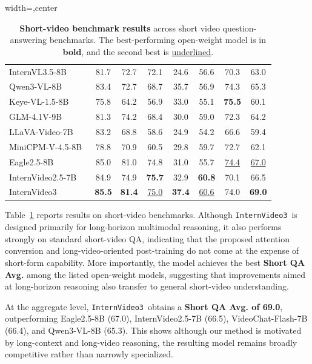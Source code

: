 \documentclass[11pt, letterpaper]{template}
\theoremstyle{plain}
\theoremstyle{definition}
\theoremstyle{remark}
\newcommand{\name}{\texttt{InternVideo3}\xspace}
\begin{document}
\begin{table}[t]
\begin{adjustbox}{width=\linewidth,center}
\begin{tabular}{lccccccc}
InternVL3.5-8B~\citep{internvl35} & 81.7 & 72.7 & 72.1 & 24.6 & 56.6 & 70.3 & 63.0\\
Qwen3-VL-8B~\citep{qwen3vl} & 83.4 & 72.7 & 68.7 & 35.7 & 56.9 & 74.3 & 65.3\\
Keye-VL-1.5-8B~\citep{keyevl15} & 75.8 & 64.2 & 56.9 & 33.0 & 55.1 & \textbf{75.5} & 60.1\\
GLM-4.1V-9B~\citep{hong2025glm} & 81.3 & 74.2 & 68.4 & 30.0 & 59.0 & 72.3 & 64.2\\
LLaVA-Video-7B~\citep{zhang2024llava} & 83.2 & 68.8 & 58.6 & 24.9 & 54.2 & 66.6 & 59.4\\
MiniCPM-V-4.5-8B~\citep{yu2025minicpm} & 78.8 & 70.9 & 60.5 & 29.8 & 59.7 & 72.7 & 62.1\\
Eagle2.5-8B~\citep{chen2026eagle} & 85.0 & 81.0 & 74.8 & 31.0 & 55.7 & \underline{74.4} & \underline{67.0}\\
InternVideo2.5-7B~\citep{wang2025internvideo2} & 84.9 & 74.9 & \textbf{75.7} & 32.9 & \textbf{60.8} & 70.1 & 66.5\\
InternVideo3 & \textbf{85.5} & \textbf{81.4} & \underline{75.0} & \textbf{37.4} & \underline{60.6} & 74.0 & \textbf{69.0} \\
\bottomrule
\end{tabular}
\end{adjustbox}
\caption{\textbf{Short-video benchmark results} across short video question-answering benchmarks. The best-performing open-weight model is in \textbf{bold}, and the second best is \underline{underlined}.}
\label{tab:short_video_benchmark_results}
\end{table}

Table~\ref{tab:short_video_benchmark_results} reports results on short-video benchmarks. Although \name\ is designed primarily for long-horizon multimodal reasoning, it also performs strongly on standard short-video QA, indicating that the proposed attention conversion and long-video-oriented post-training do not come at the expense of short-form capability. More importantly, the model achieves the best \textbf{Short QA Avg.} among the listed open-weight models, suggesting that improvements aimed at long-horizon reasoning also transfer to general short-video understanding.

At the aggregate level, \name\ obtains a \textbf{Short QA Avg. of 69.0}, outperforming Eagle2.5-8B (67.0), InternVideo2.5-7B (66.5), VideoChat-Flash-7B (66.4), and Qwen3-VL-8B (65.3). This shows although our method is motivated by long-context and long-video reasoning, the resulting model remains broadly competitive rather than narrowly specialized.
\end{document}
